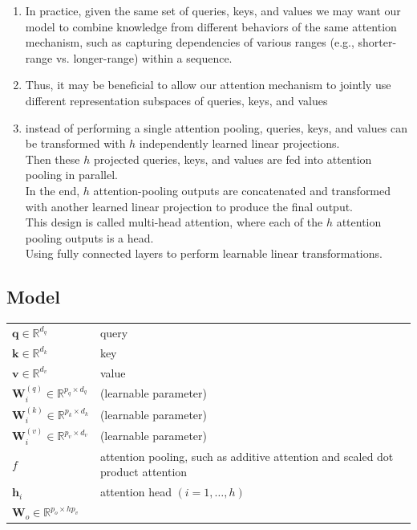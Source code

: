 \begin{enumerate}
    \item In practice, given the same set of queries, keys, and values we may want our model to combine knowledge from different behaviors of the same attention mechanism, such as capturing dependencies of various ranges (e.g., shorter-range vs. longer-range) within a sequence. 
    
    \item Thus, it may be beneficial to allow our attention mechanism to jointly use different representation subspaces of queries, keys, and values

    \item instead of performing a single attention pooling, queries, keys, and values can be transformed with $h$ independently learned linear projections. \\
    Then these $h$ projected queries, keys, and values are fed into attention pooling in parallel.\\
    In the end, $h$ attention-pooling outputs are concatenated and transformed with another learned linear projection to produce the final output.\\
    This design is called multi-head attention, where each of the $h$ attention pooling outputs is a head.\\
    Using fully connected layers to perform learnable linear transformations.


\end{enumerate}


\subsection*{Model \cite{dnn-1}}

\begin{customTableWrapper}{1.5}
\begin{longtable}{l p{8cm}}
    $\mathbf{q} \in \mathbb{R}^{d_q}$ & query \\

    $\mathbf{k} \in \mathbb{R}^{d_k}$ & key \\

    $\mathbf{v} \in \mathbb{R}^{d_v}$ & value \\

    $\mathbf W_i^{(q)}\in\mathbb R^{p_q\times d_q}$ & (learnable parameter) \\

    $\mathbf W_i^{(k)}\in\mathbb R^{p_k\times d_k}$ & (learnable parameter) \\

    $\mathbf W_i^{(v)}\in\mathbb R^{p_v\times d_v}$ & (learnable parameter) \\

    $f$ & attention pooling, such as additive attention and scaled dot product attention \\

    $\mathbf{h}_i$ & attention head $(i = 1, \ldots, h)$ \\

    $\mathbf W_o\in\mathbb R^{p_o\times h p_v}$ & \\
\end{longtable}
\end{customTableWrapper}

